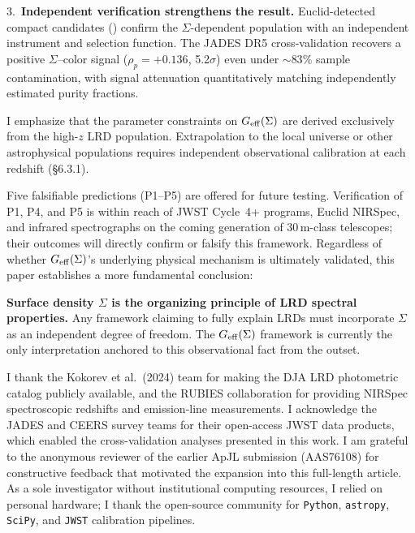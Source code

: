 \documentclass[apj,twocolumn,longbibliography,linenumbers]{aastex701}
\begin{document}
3.~\textbf{Independent verification strengthens the result.} Euclid-detected compact candidates (\citealt{Tumborang2026}) confirm the $\Sigma$-dependent population with an independent instrument and selection function. The JADES DR5 cross-validation recovers a positive $\Sigma$--color signal ($\rho_p = +0.136$, 5.2$\sigma$) even under ${\sim}83\%$ sample contamination, with signal attenuation quantitatively matching independently estimated purity fractions.

I emphasize that the parameter constraints on $G_{\rm eff}(\Sigma)$ are derived exclusively from the high-$z$ LRD population. Extrapolation to the local universe or other astrophysical populations requires independent observational calibration at each redshift (\S6.3.1).

Five falsifiable predictions (P1--P5) are offered for future testing. Verification of P1, P4, and P5 is within reach of JWST Cycle~4+ programs, Euclid NIRSpec, and infrared spectrographs on the coming generation of 30\,m-class telescopes; their outcomes will directly confirm or falsify this framework. Regardless of whether $G_{\rm eff}(\Sigma)$'s underlying physical mechanism is ultimately validated, this paper establishes a more fundamental conclusion:

\textbf{Surface density $\Sigma$ is the organizing principle of LRD spectral properties.} Any framework claiming to fully explain LRDs must incorporate $\Sigma$ as an independent degree of freedom. The $G_{\rm eff}(\Sigma)$ framework is currently the only interpretation anchored to this observational fact from the outset.

\begin{acknowledgments}
I thank the Kokorev et al.\ (2024) team for making the DJA LRD photometric catalog publicly available, and the RUBIES collaboration for providing NIRSpec spectroscopic redshifts and emission-line measurements. I acknowledge the JADES and CEERS survey teams for their open-access JWST data products, which enabled the cross-validation analyses presented in this work. I am grateful to the anonymous reviewer of the earlier ApJL submission (AAS76108) for constructive feedback that motivated the expansion into this full-length article. As a sole investigator without institutional computing resources, I relied on personal hardware; I thank the open-source community for \texttt{Python}, \texttt{astropy}, \texttt{SciPy}, and \texttt{JWST} calibration pipelines.
\end{acknowledgments}
\end{document}
